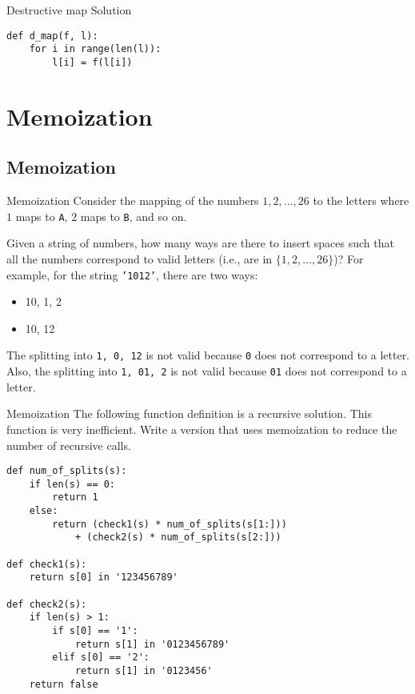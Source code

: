 \documentclass[9pt]{beamer}
\begin{document}
\begin{frame}[fragile]{Destructive map}
  Solution

  \begin{lstlisting}
def d_map(f, l):
    for i in range(len(l)):
        l[i] = f(l[i])
  \end{lstlisting}

\end{frame}

\section{Memoization}
\subsection{Memoization}

\begin{frame}[fragile]{Memoization}
  Consider the mapping of the numbers $1, 2, \dots, 26$ to the letters where
  $1$ maps to {\tt A}, $2$ maps to {\tt B}, and so on.

  Given a string of numbers, how many ways are there to insert spaces such
  that all the numbers correspond to valid letters (i.e., are in $\{1, 2,
  \dots, 26\}$)? For example, for the string {\tt '1012'}, there are two
  ways:

  \begin{itemize}
    \item
      10, 1, 2
    \item
      10, 12
  \end{itemize}

  The splitting into {\tt 1, 0, 12} is not valid because {\tt 0} does not
  correspond to a letter. Also, the splitting into {\tt 1, 01, 2} is not
  valid because {\tt 01} does not correspond to a letter.
\end{frame}

\begin{frame}[fragile]{Memoization}
  The following function definition is a recursive solution. This function
  is very inefficient. Write a version that uses memoization to reduce the
  number of recursive calls.

  \begin{lstlisting}
def num_of_splits(s):
    if len(s) == 0:
        return 1
    else:
        return (check1(s) * num_of_splits(s[1:]))
            + (check2(s) * num_of_splits(s[2:]))

def check1(s):
    return s[0] in '123456789'

def check2(s):
    if len(s) > 1:
        if s[0] == '1':
            return s[1] in '0123456789'
        elif s[0] == '2':
            return s[1] in '0123456'
    return false
  \end{lstlisting}
\end{frame}
\end{document}
